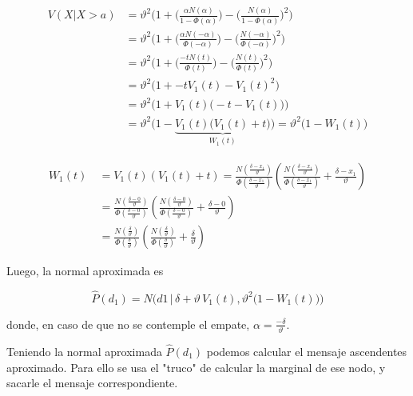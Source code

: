 \documentclass[11pt,twoside, spanish]{report} %
\begin{document}
\begin{equation}\label{eq:variance_aprox_}
	\begin{split}
		V(X|  X > a) & = \vartheta^2 \Bigg( 1 + \bigg(\frac{\alpha N(\alpha)}{1 - \Phi(\alpha) }\bigg) - \bigg(\frac{N(\alpha)}{1 - \Phi(\alpha) }\bigg)^2 \Bigg) \\
		& = \vartheta^2 \Bigg( 1 + \bigg(\frac{\alpha N(-\alpha)}{\Phi(-\alpha) }\bigg) - \bigg(\frac{N(-\alpha)}{\Phi(-\alpha) }\bigg)^2 \Bigg) \\
		& = \vartheta^2 \Bigg( 1 + \bigg(\frac{-t N(t)}{\Phi(t) }\bigg) - \bigg(\frac{N(t)}{\Phi(t) }\bigg)^2 \Bigg) \\
		& = \vartheta^2 \Big( 1 +  -t V_1(t) - V_1(t)^2 \Big) \\
		& = \vartheta^2 \Big( 1 + V_1(t) \big(-t  - V_1(t)\big) \Big)  \\
		& = \vartheta^2 \Big( 1 - \underbrace{V_1(t) \big(V_1(t) + t \big)}_{W_1(t)} \Big)  = \vartheta^2 \big( 1 - W_1(t) \big)
	\end{split}
\end{equation}

\begin{equation}
	\begin{split}
		W_1(t)\ &= V_1(t)(V_1(t) + t) = \frac{N(\frac{\delta-x_1}{\vartheta})}{\Phi(\frac{\delta-x_1}{\vartheta})}\left(\frac{N(\frac{\delta-x_1}{\vartheta})}{\Phi(\frac{\delta-x_1}{\vartheta})}+ \frac{\delta -x_1}{\vartheta}\right) \\
		&=\frac{N(\frac{\delta-0}{\vartheta})}{\Phi(\frac{\delta-0}{\vartheta})}\left(\frac{N(\frac{\delta-0}{\vartheta})}{\Phi(\frac{\delta-0}{\vartheta})}+ \frac{\delta -0}{\vartheta}\right)\\
		&=\frac{N(\frac{\delta}{\vartheta})}{\Phi(\frac{\delta}{\vartheta})}\left(\frac{N(\frac{\delta}{\vartheta})}{\Phi(\frac{\delta}{\vartheta})}+ \frac{\delta}{\vartheta}\right)
	\end{split}
\end{equation}

Luego, la normal aproximada es

\begin{equation}\label{eq:p*_d}
	\widehat{P}(d_1) = N\Bigg(d1 \,  \bigg| \,  \delta + \vartheta \, V_1(t) ,  \vartheta^2 \big( 1 - W_1(t) \big)  \Bigg)
\end{equation}

donde, en caso de que no se contemple el empate, $\alpha=\frac{-\delta}{\vartheta}$.

Teniendo la normal aproximada $\widehat{P}(d_1)$ podemos calcular el mensaje ascendentes aproximado. Para ello se usa el "truco" de calcular la marginal de ese nodo, y sacarle el mensaje correspondiente.
\end{document}
